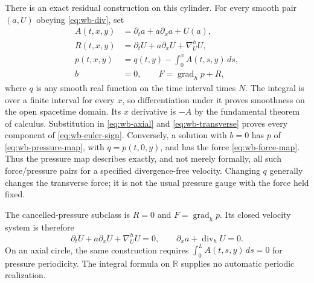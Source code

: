 There is an exact residual construction on this cylinder. For every
smooth pair $(a,U)$ obeying \eqref{eq:wb-div}, set
\begin{align}
 A(t,x,y)&=\partial_ta+a\partial_xa+U(a),\\
 R(t,x,y)&=\partial_tU+a\partial_xU+\nabla^h_U U,\\
 p(t,x,y)&=q(t,y)-\int_0^x A(t,s,y)\,ds,
 \label{eq:wb-pressure-map}\\
 b&=0,\qquad F=\operatorname{grad}_h p+R,
 \label{eq:wb-force-map}
\end{align}
where $q$ is any smooth real function on the time interval times $N$.
The integral is over a finite interval for every $x$, so differentiation
under it proves smoothness on the open spacetime domain. Its $x$
derivative is $-A$ by the fundamental theorem of calculus. Substitution
in \eqref{eq:wb-axial} and \eqref{eq:wb-transverse} proves every component
of \eqref{eq:wb-euler-sign}. Conversely, a solution with $b=0$ has
$p$ of \eqref{eq:wb-pressure-map}, with $q=p(t,0,y)$, and has the
force \eqref{eq:wb-force-map}. Thus the pressure map describes exactly,
and not merely formally, all such force/pressure pairs for a specified
divergence-free velocity. Changing $q$ generally changes the transverse
force; it is not the usual pressure gauge with the force held fixed.

The cancelled-pressure subclass is $R=0$ and
$F=\operatorname{grad}_h p$. Its closed velocity system is therefore
\begin{equation}\label{eq:wb-cylinder-closed}
 \partial_tU+a\partial_xU+\nabla^h_U U=0,
 \qquad \partial_xa+\operatorname{div}_hU=0.
\end{equation}
On an axial circle, the same construction requires
$\int_0^L A(t,s,y)\,ds=0$ for pressure periodicity. The integral formula
on $\mathbb R$ supplies no automatic periodic realization.

